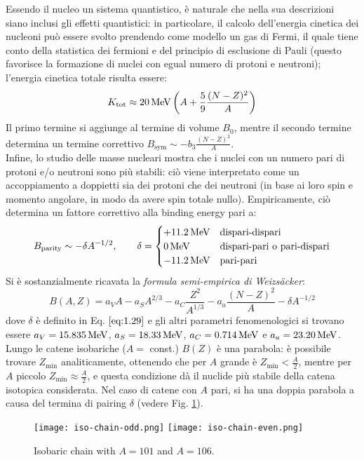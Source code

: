 Essendo il nucleo un sistema quantistico, è naturale che nella sua descrizioni siano inclusi gli effetti quantistici: in particolare, il calcolo dell'energia cinetica dei nucleoni può essere svolto prendendo come modello un gas di Fermi, il quale tiene conto della statistica dei fermioni e del principio di esclusione di Pauli (questo favorisce la formazione di nuclei con egual numero di protoni e neutroni); l'energia cinetica totale risulta essere:
\begin{equation}
	K_{\text{tot}} \approx 20 \,\mathrm{MeV} \left( A + \frac{5}{9} \frac{(N - Z)^2}{A} \right)
	\label{eq:1.28}
\end{equation}
Il primo termine si aggiunge al termine di volume $ B_0 $, mentre il secondo termine determina un termine correttivo $ B_{\text{sym}} \sim - b_3 \frac{(N - Z)^2}{A} $.\\
Infine, lo studio delle masse nucleari mostra che i nuclei con un numero pari di protoni e/o neutroni sono più stabili: ciò viene interpretato come un accoppiamento a doppietti sia dei protoni che dei neutroni (in base ai loro spin e momento angolare, in modo da avere spin totale nullo). Empiricamente, ciò determina un fattore correttivo alla binding energy pari a:
\begin{equation}
	B_{\text{parity}} \sim - \delta A^{-1/2}, \qquad \delta =
	\begin{cases}
		+11.2\,\mathrm{MeV} & \text{dispari-dispari} \\
		0\,\mathrm{MeV} & \text{dispari-pari o pari-dispari} \\
		-11.2\,\mathrm{MeV} & \text{pari-pari}
	\end{cases}
	\label{eq:1.29}
\end{equation}
Si è sostanzialmente ricavata la \textit{formula semi-empirica di Weizsäcker}:
\begin{equation}
	B(A,Z) = a_V A - a_S A^{2/3} - a_C \frac{Z^2}{A^{1/3}} - a_a \frac{(N - Z)^2}{A} - \delta A^{-1/2}
	\label{eq:1.30}
\end{equation}
dove $ \delta $ è definito in Eq. $ \ref{eq:1.29} $ e gli altri parametri fenomenologici si trovano essere $ a_V = 15.835\,\mathrm{MeV} $, $ a_S = 18.33\,\mathrm{MeV} $, $ a_C = 0.714\,\mathrm{MeV} $ e $ a_a = 23.20\,\mathrm{MeV} $.\\
Lungo le catene isobariche ($ A = $ const.) $ B(Z) $ è una parabola: è possibile trovare $ Z_{\text{min}} $ analiticamente, ottenendo che per $ A $ grande è $ Z_{\text{min}} < \frac{A}{2} $, mentre per $ A $ piccolo $ Z_{\text{min}} \approx \frac{A}{2} $, e questa condizione dà il nuclide più stabile della catena isotopica considerata. Nel caso di catene con $ A $ pari, si ha una doppia parabola a causa del termina di pairing $ \delta $ (vedere Fig. \ref{iso-chain}).
\begin{figure}[!h]
	\centering
	\texttt{[image: iso-chain-odd.png]}
	\texttt{[image: iso-chain-even.png]}
	\caption{Isobaric chain with $ A = 101 $ and $ A = 106 $.}
	\label{iso-chain}
\end{figure}

